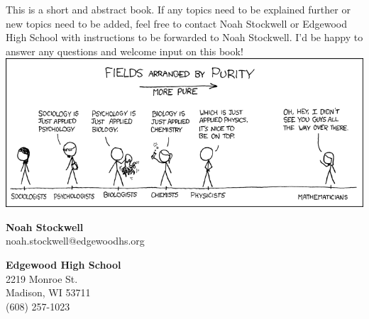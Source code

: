 This is a short and abstract book. If any topics need to be explained further or new topics need to be added, feel free to contact Noah Stockwell or Edgewood High School with instructions to be forwarded to Noah Stockwell. I'd be happy to answer any questions and welcome input on this book!
\vfill
\includegraphics[width=\textwidth]{images/purity.png}
\vspace{.25in}
\par \textbf{Noah Stockwell}\\
noah.stockwell@edgewoodhs.org\\
\par \textbf{Edgewood High School}\\
2219 Monroe St.\\ Madison, WI 53711\\ (608) 257-1023